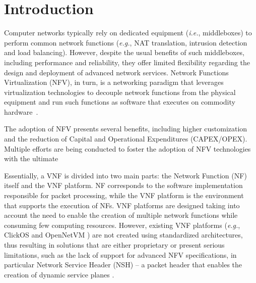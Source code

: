
\section{Introduction}\label{INTRO}

Computer networks typically rely on dedicated equipment (\textit{i.e.}, middleboxes) to perform common network functions (\textit{e.g.}, NAT translation, intrusion detection and load balancing). However, despite the usual benefits of such middleboxes, including performance and reliability, they offer limited flexibility regarding the design and deployment of advanced network services. Network Functions Virtualization (NFV), in turn, is a networking paradigm that leverages virtualization technologies to decouple network functions from the physical equipment and run such functions as software that executes on commodity hardware~\cite{ETSI-2012}.

The adoption of NFV presents several benefits, including higher customization and the reduction of Capital and Operational Expenditures (CAPEX/OPEX). Multiple efforts are being conducted to foster the adoption of NFV technologies with the ultimate 


Essentially, a VNF is divided into two main parts: the Network Function (NF) itself and the VNF platform.  NF corresponds to the software implementation responsible for packet processing, while the VNF platform is the environment that supports the execution of NFs. VNF platforms are designed taking into account the need to enable the creation of multiple network functions while consuming few computing resources. However, existing VNF platforms (\textit{e.g.}, ClickOS \cite{Martins-2014} and OpenNetVM \cite{Zhang-2016}) are not created using standardized architectures, thus resulting in solutions that are either proprietary or present serious limitations, such as the lack of support for advanced NFV specifications, in particular Network Service Header (NSH) -- a packet header that enables the creation of dynamic service planes \cite{Quinn-2018}.

